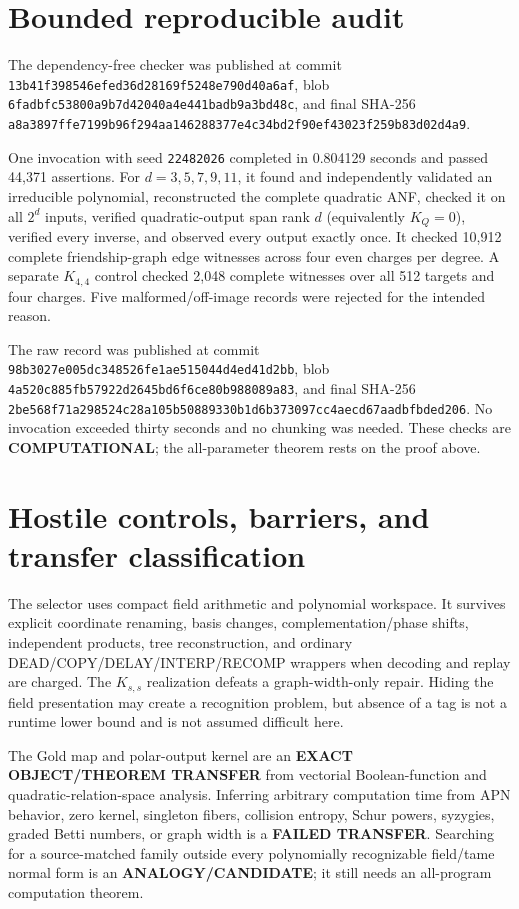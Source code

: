 \documentclass[11pt]{article}
\newcommand{\COMP}{\textbf{COMPUTATIONAL}}
\begin{document}
\section{Bounded reproducible audit}
The dependency-free checker
was published at commit
\texttt{13b41f398546efed36d28169f5248e790d40a6af}, blob
\texttt{6fadbfc53800a9b7d42040a4e441badb9a3bd48c}, and final SHA-256
\texttt{a8a3897ffe7199b96f294aa146288377e4c34bd2f90ef43023f259b83d02d4a9}.

One invocation with seed \texttt{22482026} completed in 0.804129 seconds and
passed 44,371 assertions.  For $d=3,5,7,9,11$, it found and independently
validated an irreducible polynomial, reconstructed the complete quadratic
ANF, checked it on all $2^d$ inputs, verified quadratic-output span rank $d$
(equivalently $K_Q=0$), verified every inverse, and observed every output
exactly once.  It checked 10,912 complete friendship-graph edge witnesses
across four even charges per degree.  A separate $K_{4,4}$ control checked
2,048 complete witnesses over all 512 targets and four charges.  Five
malformed/off-image records were rejected for the intended reason.

The raw record
was published at commit
\texttt{98b3027e005dc348526fe1ae515044d4ed41d2bb}, blob
\texttt{4a520c885fb57922d2645bd6f6ce80b988089a83}, and final SHA-256
\texttt{2be568f71a298524c28a105b50889330b1d6b373097cc4aecd67aadbfbded206}.
No invocation exceeded thirty seconds and no chunking was needed.  These
checks are \COMP{}; the all-parameter theorem rests on the proof above.

\section{Hostile controls, barriers, and transfer classification}
The selector uses compact field arithmetic and polynomial workspace.  It
survives explicit coordinate renaming, basis changes, complementation/phase
shifts, independent products, tree reconstruction, and ordinary
DEAD/COPY/DELAY/INTERP/RECOMP wrappers when decoding and replay are charged.
The $K_{s,s}$ realization defeats a graph-width-only repair.  Hiding the field
presentation may create a recognition problem, but absence of a tag is not a
runtime lower bound and is not assumed difficult here.

The Gold map and polar-output kernel are an \textbf{EXACT OBJECT/THEOREM
TRANSFER} from vectorial Boolean-function and quadratic-relation-space
analysis.  Inferring arbitrary computation time from APN behavior, zero
kernel, singleton fibers, collision entropy, Schur powers, syzygies, graded
Betti numbers, or graph width is a \textbf{FAILED TRANSFER}.  Searching for a
source-matched family outside every polynomially recognizable field/tame
normal form is an \textbf{ANALOGY/CANDIDATE}; it still needs an all-program
computation theorem.
\end{document}
